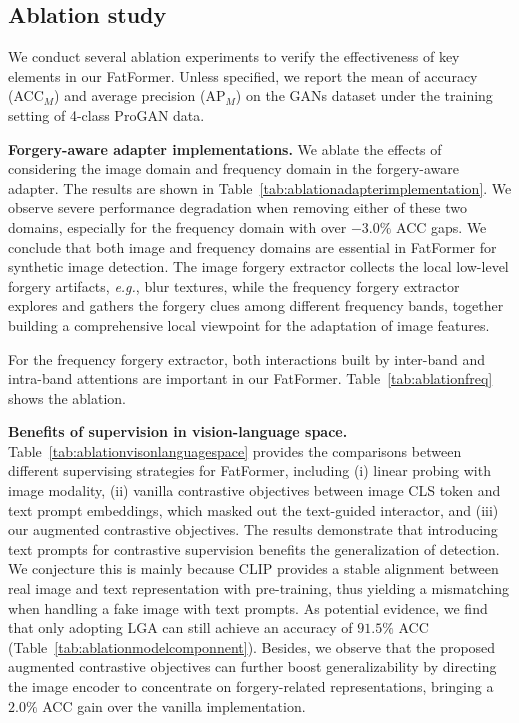 \documentclass[10pt,twocolumn,letterpaper]{article}
\begin{document}
\subsection{Ablation study}
\label{sec:ablation}
We conduct several ablation experiments to verify the effectiveness of key elements in our FatFormer. Unless specified, we report the mean of accuracy (ACC$_M$) and average precision (AP$_M$) on the GANs dataset under the training setting of 4-class ProGAN data.


\noindent \textbf{Forgery-aware adapter implementations.}
We ablate the effects of considering the image domain and frequency domain in the forgery-aware adapter. The results are shown in Table~\ref{tab:ablationadapterimplementation}. We observe severe performance degradation when removing either of these two domains, especially for the frequency domain with over $-3.0\%$ ACC gaps. We conclude that both image and frequency domains are essential in FatFormer for synthetic image detection. The image forgery extractor collects the local low-level forgery artifacts, {\em e.g.}, blur textures, while the frequency forgery extractor explores and gathers the forgery clues among different frequency bands, together building a comprehensive local viewpoint for the adaptation of image features. 

For the frequency forgery extractor, both interactions built by inter-band and intra-band attentions are important in our FatFormer. Table~\ref{tab:ablationfreq} shows the ablation.

\noindent \textbf{Benefits of supervision in vision-language space.}
Table~\ref{tab:ablationvisonlanguagespace} provides the comparisons between different supervising strategies for FatFormer, including (i) linear probing with image modality, (ii) vanilla contrastive objectives between image CLS token and text prompt embeddings, which masked out the text-guided interactor, and (iii) our augmented contrastive objectives. The results demonstrate that introducing text prompts for contrastive supervision benefits the generalization of detection. 
We conjecture this is mainly because CLIP provides a stable alignment between real image and text representation with pre-training, thus yielding a mismatching when handling a fake image with text prompts. As potential evidence, we find that only adopting LGA can still achieve an accuracy of $91.5\%$ ACC (Table~\ref{tab:ablationmodelcomponnent}). 
Besides, we observe that the proposed augmented contrastive objectives can further boost generalizability by directing the image encoder to concentrate on forgery-related representations, bringing a $2.0\%$ ACC gain over the vanilla implementation.
\end{document}
